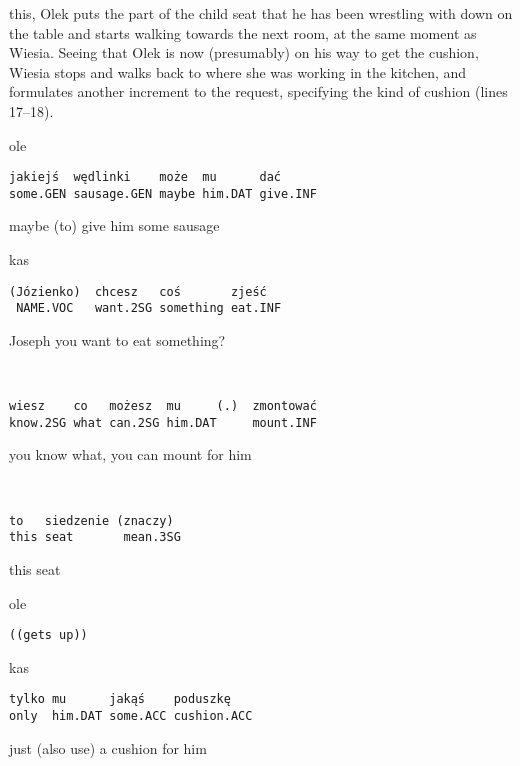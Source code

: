 \documentclass[output=paper]{langsci/langscibook}
\begin{document}
this, Olek puts the part of the child seat that he has been wrestling with down on the table and starts walking towards the next room, at the same moment as Wiesia.  Seeing that Olek is now (presumably) on his way to get the cushion, Wiesia stops and walks back to where she was working in the kitchen, and formulates another increment to the request, specifying the kind of cushion (lines 17--18).

\newpage
\largerpage[2]
\vspace{1mm}
%
\begin{transbox}{1}{ole}
\begin{verbatim}
jakiejś  wędlinki    może  mu      dać
some.GEN sausage.GEN maybe him.DAT give.INF
\end{verbatim}
maybe (to) give him some sausage
\end{transbox}
%
\begin{transbox}{2}{kas}
\begin{verbatim}
(Józienko)  chcesz   coś       zjeść
 NAME.VOC   want.2SG something eat.INF
\end{verbatim}
Joseph you want to eat something?
\end{transbox}
%
\begin{transbox}{3}{~}
\begin{verbatim}
wiesz    co   możesz  mu     (.)  zmontować
know.2SG what can.2SG him.DAT     mount.INF
\end{verbatim}
you know what, you can mount for him
\end{transbox}
%
\begin{transbox}{4}{~}
\begin{verbatim}
to   siedzenie (znaczy)
this seat       mean.3SG
\end{verbatim}
this seat
\end{transbox}
%
\begin{transbox}{5}{ole}
\begin{verbatim}
((gets up))
\end{verbatim}
\end{transbox}
%
\begin{mdframednoverticalspace}[style=firstfoc]
\begin{transbox}{6}{kas}
\begin{verbatim}
tylko mu      jakąś    poduszkę
only  him.DAT some.ACC cushion.ACC
\end{verbatim}
just (also use) a cushion for him
\end{transbox}
\end{mdframednoverticalspace}
\end{document}
